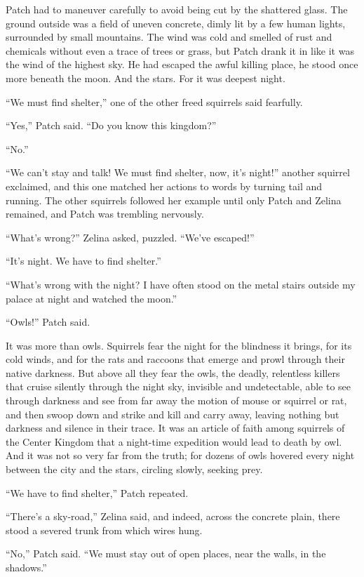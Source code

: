 \documentclass[ebook,oneside,openany,17pt]{memoir}
\begin{document}
Patch had to maneuver carefully to avoid being cut by the shattered
glass. The ground outside was a field of uneven concrete, dimly lit by
a few human lights, surrounded by small mountains. The wind was cold
and smelled of rust and chemicals without even a trace of trees or
grass, but Patch drank it in like it was the wind of the highest
sky. He had escaped the awful killing place, he stood once more
beneath the moon. And the stars. For it was deepest night.

“We must find shelter,” one of the other freed squirrels said
fearfully.

“Yes,” Patch said. “Do you know this kingdom?”

“No.”

“We can’t stay and talk! We must find shelter, now, it’s night!”
another squirrel exclaimed, and this one matched her actions to words
by turning tail and running. The other squirrels followed her example
until only Patch and Zelina remained, and Patch was trembling
nervously.

“What’s wrong?” Zelina asked, puzzled. “We’ve escaped!”

“It’s night. We have to find shelter.”

“What’s wrong with the night? I have often stood on the metal stairs
outside my palace at night and watched the moon.”

“Owls!” Patch said.

It was more than owls. Squirrels fear the night for the blindness it
brings, for its cold winds, and for the rats and raccoons that emerge
and prowl through their native darkness. But above all they fear the
owls, the deadly, relentless killers that cruise silently through the
night sky, invisible and undetectable, able to see through darkness
and see from far away the motion of mouse or squirrel or rat, and then
swoop down and strike and kill and carry away, leaving nothing but
darkness and silence in their trace. It was an article of faith among
squirrels of the Center Kingdom that a night-time expedition would
lead to death by owl. And it was not so very far from the truth; for
dozens of owls hovered every night between the city and the stars,
circling slowly, seeking prey.

“We have to find shelter,” Patch repeated.

“There’s a sky-road,” Zelina said, and indeed, across the concrete
plain, there stood a severed trunk from which wires hung.

“No,” Patch said. “We must stay out of open places, near the walls, in
the shadows.”
\end{document}
